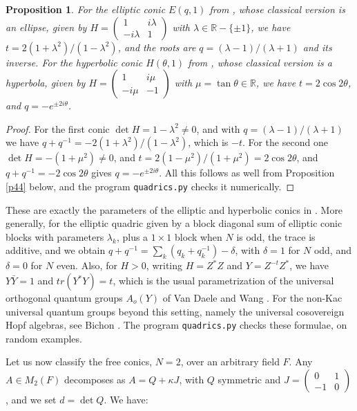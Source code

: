 \documentclass[11pt]{amsart}
\newtheorem{proposition}[theorem]{Proposition}
\theoremstyle{definition}
\begin{document}
\begin{proposition}
\label{p43}
For the elliptic conic $E(q,1)$ from \cite{fba}, whose classical version is an ellipse, given by $H=\begin{pmatrix}1&i\lambda\\-i\lambda&1\end{pmatrix}$ with $\lambda\in\mathbb R-\{\pm1\}$, we have $t=2(1+\lambda^2)/(1-\lambda^2)$, and the roots are $q=(\lambda-1)/(\lambda+1)$ and its inverse. For the hyperbolic conic $H(\theta,1)$ from \cite{fba}, whose classical version is a hyperbola, given by $H=\begin{pmatrix}1&i\mu\\-i\mu&-1\end{pmatrix}$ with $\mu=\tan\theta\in\mathbb R$, we have $t=2\cos2\theta$, and $q=-e^{\pm2i\theta}$.
\end{proposition}

\begin{proof}
For the first conic $\det H=1-\lambda^2\neq0$, and with $q=(\lambda-1)/(\lambda+1)$ we have $q+q^{-1}=-2(1+\lambda^2)/(1-\lambda^2)$, which is $-t$. For the second one $\det H=-(1+\mu^2)\neq0$, and $t=2(1-\mu^2)/(1+\mu^2)=2\cos2\theta$, and $q+q^{-1}=-2\cos2\theta$ gives $q=-e^{\pm2i\theta}$. All this follows as well from Proposition \ref{p44} below, and the program {\tt quadrics.py} checks it numerically.
\end{proof}

These are exactly the parameters of the elliptic and hyperbolic conics in \cite{fba}. More generally, for the elliptic quadric given by a block diagonal sum of elliptic conic blocks with parameters $\lambda_k$, plus a $1\times1$ block when $N$ is odd, the trace is additive, and we obtain $q+q^{-1}=\sum_k(q_k+q_k^{-1})-\delta$, with $\delta=1$ for $N$ odd, and $\delta=0$ for $N$ even. Also, for $H>0$, writing $H=Z^*Z$ and $Y=Z^{-t}Z^*$, we have $Y\bar Y=1$ and $tr(Y^*Y)=t$, which is the usual parametrization of the universal orthogonal quantum groups $A_o(Y)$ of Van Daele and Wang \cite{vdw}. For the non-Kac universal quantum groups beyond this setting, namely the universal cosovereign Hopf algebras, see Bichon \cite{bi2}. The program {\tt quadrics.py} checks these formulae, on random examples.

Let us now classify the free conics, $N=2$, over an arbitrary field $F$. Any $A\in M_2(F)$ decomposes as $A=Q+\kappa J$, with $Q$ symmetric and $J=\begin{pmatrix}0&1\\-1&0\end{pmatrix}$, and we set $d=\det Q$. We have:
\end{document}
